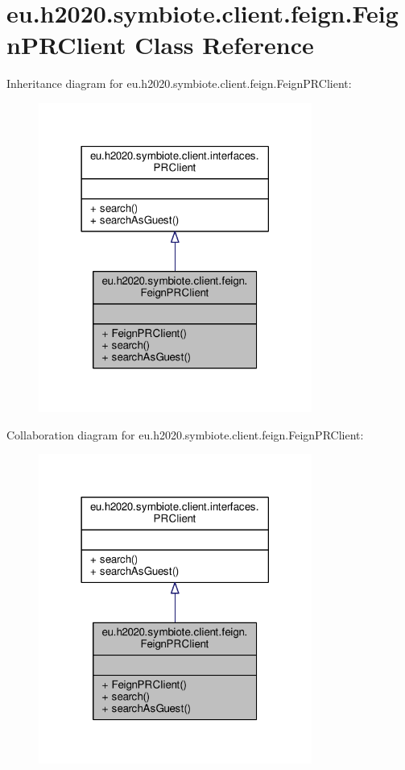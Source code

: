 \hypertarget{classeu_1_1h2020_1_1symbiote_1_1client_1_1feign_1_1FeignPRClient}{}\section{eu.\+h2020.\+symbiote.\+client.\+feign.\+Feign\+P\+R\+Client Class Reference}
\label{classeu_1_1h2020_1_1symbiote_1_1client_1_1feign_1_1FeignPRClient}


Inheritance diagram for eu.\+h2020.\+symbiote.\+client.\+feign.\+Feign\+P\+R\+Client\+:\nopagebreak
\begin{figure}[H]
\begin{center}
\leavevmode
\includegraphics[width=254pt]{classeu_1_1h2020_1_1symbiote_1_1client_1_1feign_1_1FeignPRClient__inherit__graph}
\end{center}
\end{figure}


Collaboration diagram for eu.\+h2020.\+symbiote.\+client.\+feign.\+Feign\+P\+R\+Client\+:\nopagebreak
\begin{figure}[H]
\begin{center}
\leavevmode
\includegraphics[width=254pt]{classeu_1_1h2020_1_1symbiote_1_1client_1_1feign_1_1FeignPRClient__coll__graph}
\end{center}
\end{figure}
